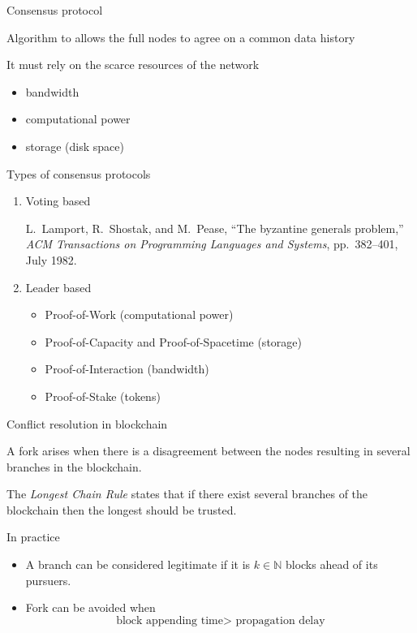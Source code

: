 \documentclass{beamer}
\begin{document}
\begin{frame}{Consensus protocol}
\begin{tcolorbox}[enhanced,drop shadow, title=Definition]
    Algorithm to allows the full nodes to agree on a common data history
\end{tcolorbox}
It must rely on the scarce resources of the network
\begin{itemize}
  \item bandwidth
  \item computational power
  \item storage (disk space)
\end{itemize}
\end{frame}
\begin{frame}{Types of consensus protocols}
\begin{enumerate}
  \item Voting based 
  \footnotesize
\begin{thebibliography}{1}

L.~Lamport, R.~Shostak, and M.~Pease, ``The byzantine generals problem,'' {\em
  ACM Transactions on Programming Languages and Systems}, pp.~382--401, July
  1982.

\end{thebibliography}
\normalsize\medskip 
  \item Leader based
  \begin{itemize}
    \item Proof-of-Work (computational power)
    \item Proof-of-Capacity and Proof-of-Spacetime (storage)
    \item Proof-of-Interaction (bandwidth)
    \item Proof-of-Stake (tokens)
  \end{itemize}
\end{enumerate}
\end{frame}
\begin{frame}{Conflict resolution in blockchain}
\begin{tcolorbox}[enhanced,drop shadow, title=Fork]
    A fork arises when there is a disagreement between the nodes resulting in several branches in the blockchain.
\end{tcolorbox}
\begin{tcolorbox}[enhanced,drop shadow, title=LCR]
    The \textit{Longest Chain Rule} states that if there exist several branches of the blockchain then the longest should be trusted.
\end{tcolorbox}
In practice 
\begin{itemize}
  \item A branch can be considered legitimate if it is $k\in\mathbb{N}$ blocks ahead of its pursuers.
  \item Fork can be avoided when
  $$
  \text{block appending time}> \text{ propagation delay} 
  $$
\end{itemize}
\end{frame}
\end{document}
